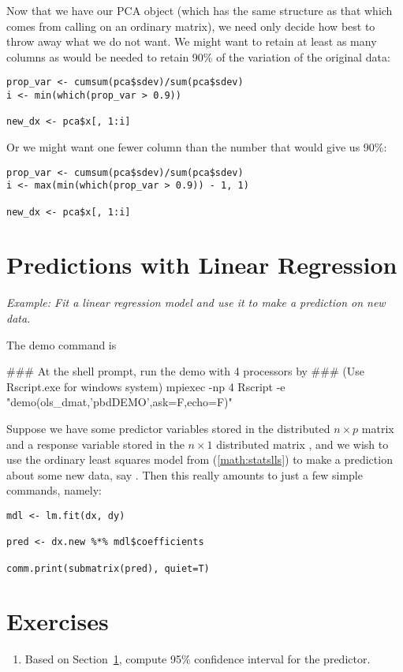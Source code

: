 Now that we have our PCA object (which has the same structure as that which comes from calling  on an ordinary  matrix), we need only decide how best to throw away what we do not want.  We might want to retain at least as many columns as would be needed to retain 90\% of the variation of the original data:

\begin{lstlisting}[language=rr]
prop_var <- cumsum(pca$sdev)/sum(pca$sdev)
i <- min(which(prop_var > 0.9))

new_dx <- pca$x[, 1:i]
\end{lstlisting}

Or we might want one fewer column than the number that would give us 90\%:

\begin{lstlisting}[language=rr]
prop_var <- cumsum(pca$sdev)/sum(pca$sdev)
i <- max(min(which(prop_var > 0.9)) - 1, 1)

new_dx <- pca$x[, 1:i]
\end{lstlisting}








\section{Predictions with Linear Regression}
\label{sec:predictions_with_linear_regression}

\emph{Example:  Fit a linear regression model and use it to make a prediction on new data.}

The demo command is
\begin{Command}
### At the shell prompt, run the demo with 4 processors by
### (Use Rscript.exe for windows system)
mpiexec -np 4 Rscript -e "demo(ols_dmat,'pbdDEMO',ask=F,echo=F)"
\end{Command}

Suppose we have some predictor variables stored in the distributed $n\times p$ matrix  and a response variable stored in the $n\times 1$ distributed matrix , and we wish to use the ordinary least squares model from (\ref{math:statslls}) to make a prediction about some new data, say .  Then this really amounts to just a few simple commands, namely:
\begin{lstlisting}[language=rr]
mdl <- lm.fit(dx, dy)

pred <- dx.new %*% mdl$coefficients

comm.print(submatrix(pred), quiet=T)
\end{lstlisting}




\section{Exercises}
\label{sec:pmclust_exercise}

\begin{enumerate}[label=\thechapter-\arabic*]

\item Based on Section~\ref{sec:predictions_with_linear_regression},
compute 95\% confidence interval for the predictor.

\end{enumerate}

